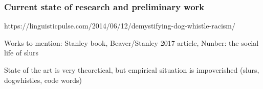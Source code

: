 \documentclass[11pt]{article}
\begin{document}












\subsubsection{Current state of research and preliminary work} %


\noindent 
https://linguisticpulse.com/2014/06/12/demystifying-dog-whistle-racism/

Works to mention: Stanley book, Beaver/Stanley 2017 article, Nunber: the social life of slurs

State of the art is very theoretical, but empirical situation is impoverished (slurs, dogwhistles, code words)


\cite*{StevensEtAl2017}
\end{document}
